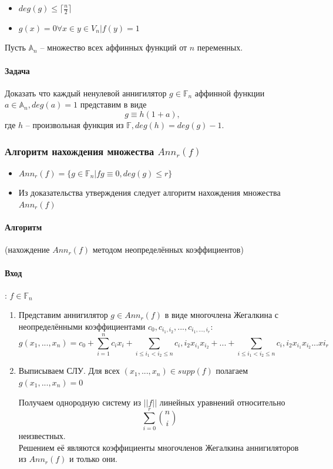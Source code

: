 \documentclass[a4paper,12pt]{article}
\begin{document}
        \begin{itemize}
          \item $deg(g) \leq \lceil \frac{n}{2} \rceil$
          \item $g(x) = 0 \forall x \in {y \in V_n | f(y) = 1}$
          \end{itemize}

        Пусть $\mathbb{A}_n$ -- множество всех аффинных функций от $n$
        переменных.

        \paragraph{Задача} Доказать что каждый ненулевой аннигилятор
        $g \in \mathbb{F}_n$ аффинной функции $a \in \mathbb{A}_n,
        deg(a) = 1$ представим в виде \[ g \equiv h(1 + a), \] где $h$
        -- произвольная функция из $\mathbb{F}, deg(h) = deg(g) - 1$.

        \subsubsection{Алгоритм нахождения множества $Ann_r(f)$}
        \begin{itemize}
          \item $Ann_r(f) = \{ g \in \mathbb{F}_n | fg \equiv 0,
            deg(g) \leq r \}$
          \item Из доказательства утверждения следует алгоритм
            нахождения множества $Ann_r(f)$
        \end{itemize}

        \paragraph{Алгоритм} (нахождение $Ann_r(f)$ методом
        неопределённых коэффициентов)

        \paragraph{Вход}: $f \in \mathbb{F}_n$

        \begin{enumerate}
          \item Представим аннигилятор $g \in Ann_r(f)$ в виде
            многочлена Жегалкина с неопределёнными коэффициентами
            $c_0, c_{i_1,i_2}, ..., c_{i_1,..., i_r}$:
            \[ g(x_1, ..., x_n) = c_0 + \sum_{i=1}^n c_ix_i + \sum_{i
                \leq i_1 < i_2 \leq n} c_i, i_2 x_{i_1} x_{i_2} +
              ... + \sum_{i
                \leq i_1 < i_2 \leq n} c_i, i_2 x_{i_1} x_{i_2}
              ... x{i_r} \]
          \item Выписываем СЛУ. Для всех $(x_1, ..., x_n) \in supp(f)$
            полагаем $g(x_1, ..., x_n) = 0$

            Получаем однородную систему из $||f||$ линейных уравнений
            относительно \[ \sum_{i=0}^r \binom{n}{i} \]
            неизвестных.\\
            Решением её являются коэффициенты многочленов Жегалкина
            аннигиляторов из $Ann_r(f)$ и только они.
        \end{enumerate}
\end{document}
